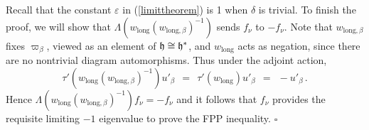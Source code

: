 \documentclass[12pt]{article}
\numberwithin{equation}{section}
\renewcommand\i{^{-1}}
\renewcommand\({\left(}
\renewcommand\){\right)}
\newcommand{\bx}{\hfill$\square$\vspace{.6cm}}
\begin{document}
Recall that the constant $\varepsilon$ in (\ref{limittheorem}) is 1 when $\delta$ is trivial.  To finish the proof, we will show that $\Lambda(w_{\text{long}}(w_{\text{long},\beta})\i)$ sends $f_\nu$ to $-f_\nu$.  Note that $w_{\text{long},\beta}$ fixes $\varpi_\beta$, viewed as an element of $\frak h\cong \frak h^*$,  and $w_{\text{long}}$ acts as negation, since there are no nontrivial diagram automorphisms.
Thus under the adjoint action,
\begin{equation}\label{varpibetanegation}
 \tau'(w_\text{long} (w_{\text{long},\beta} )\i) u'_\beta \ \ = \ \ \tau'(w_{\text{long}}) u'_\beta  \ \ = \ \ -u'_\beta\,.
\end{equation}
Hence  $\Lambda(w_{\text{long}}(w_{\text{long},\beta})\i)f_\nu=-f_\nu$ and
it follows   that $f_\nu$ provides the requisite limiting $-1$ eigenvalue to prove the FPP inequality.  \bx
\end{document}
